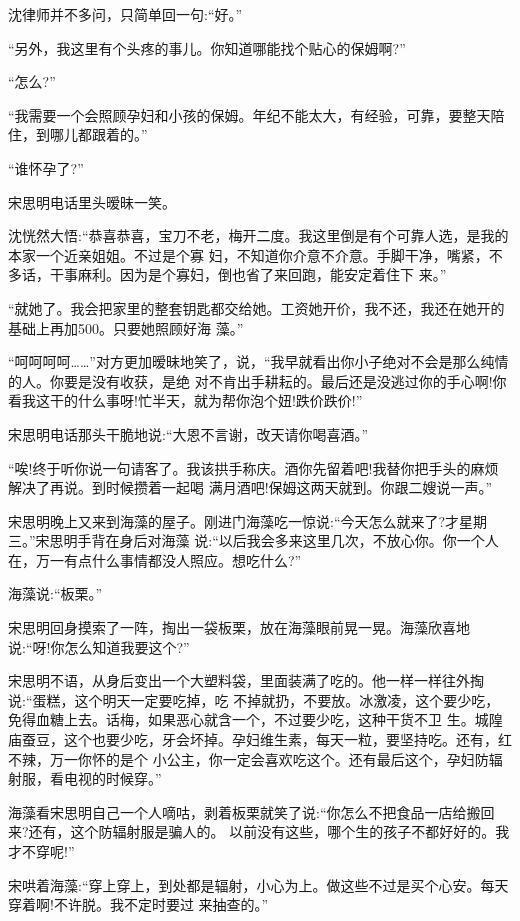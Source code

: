 \documentclass[11pt,a4paper,onecolumn]{article}
\begin{document}
沈律师并不多问，只简单回一句:``好。''

``另外，我这里有个头疼的事儿。你知道哪能找个贴心的保姆啊?''

``怎么?''

``我需要一个会照顾孕妇和小孩的保姆。年纪不能太大，有经验，可靠，要整天陪住，到哪儿都跟着的。''

``谁怀孕了?''

宋思明电话里头暧昧一笑。

沈恍然大悟:``恭喜恭喜，宝刀不老，梅开二度。我这里倒是有个可靠人选，是我的本家一个近亲姐姐。不过是个寡
妇，不知道你介意不介意。手脚干净，嘴紧，不多话，干事麻利。因为是个寡妇，倒也省了来回跑，能安定着住下
来。''

``就她了。我会把家里的整套钥匙都交给她。工资她开价，我不还，我还在她开的基础上再加500。只要她照顾好海
藻。''

``呵呵呵呵……''对方更加暧昧地笑了，说，``我早就看出你小子绝对不会是那么纯情的人。你要是没有收获，是绝
对不肯出手耕耘的。最后还是没逃过你的手心啊!你看我这干的什么事呀!忙半天，就为帮你泡个妞!跌价跌价!''

宋思明电话那头干脆地说:``大恩不言谢，改天请你喝喜酒。''

``唉!终于听你说一句请客了。我该拱手称庆。酒你先留着吧!我替你把手头的麻烦解决了再说。到时候攒着一起喝
满月酒吧!保姆这两天就到。你跟二嫂说一声。''

宋思明晚上又来到海藻的屋子。刚进门海藻吃一惊说:``今天怎么就来了?才星期三。''宋思明手背在身后对海藻
说:``以后我会多来这里几次，不放心你。你一个人在，万一有点什么事情都没人照应。想吃什么?''

海藻说:``板栗。''

宋思明回身摸索了一阵，掏出一袋板栗，放在海藻眼前晃一晃。海藻欣喜地说:``呀!你怎么知道我要这个?''

宋思明不语，从身后变出一个大塑料袋，里面装满了吃的。他一样一样往外掏说:``蛋糕，这个明天一定要吃掉，吃
不掉就扔，不要放。冰激凌，这个要少吃，免得血糖上去。话梅，如果恶心就含一个，不过要少吃，这种干货不卫
生。城隍庙蚕豆，这个也要少吃，牙会坏掉。孕妇维生素，每天一粒，要坚持吃。还有，红不辣，万一你怀的是个
小公主，你一定会喜欢吃这个。还有最后这个，孕妇防辐射服，看电视的时候穿。''

海藻看宋思明自己一个人嘀咕，剥着板栗就笑了说:``你怎么不把食品一店给搬回来?还有，这个防辐射服是骗人的。
以前没有这些，哪个生的孩子不都好好的。我才不穿呢!''

宋哄着海藻:``穿上穿上，到处都是辐射，小心为上。做这些不过是买个心安。每天穿着啊!不许脱。我不定时要过
来抽查的。''
\end{document}
